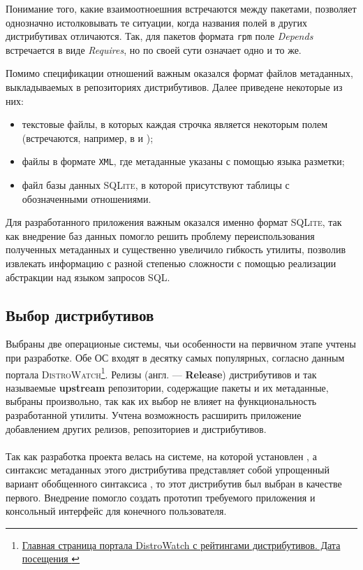 Понимание того, какие взаимоотноешния встречаются между пакетами, позволяет однозначно истолковывать те ситуации, когда названия полей в других дистрибутивах отличаются.
Так, для пакетов формата \texttt{rpm} поле \textit{Depends} встречается в виде \textit{Requires}, но по своей сути означает одно и то же.

Помимо спецификации отношений важным оказался формат файлов метаданных, выкладываемых в репозиториях дистрибутивов.
Далее приведене некоторые из них:
\begin{itemize}
	\item текстовые файлы, в которых каждая строчка является некоторым полем (встречаются, например, в {\debian} и {\ubuntu});
	\item файлы в формате \texttt{XML}, где метаданные указаны с помощью языка разметки;
	\item файл базы данных \textsc{SQLite}, в которой присутствуют таблицы с обозначенными отношениями.
\end{itemize}

Для разработанного приложения важным оказался именно формат \textsc{SQLite}, так как внедрение баз данных помогло решить проблему переиспользования полученных метаданных и существенно увеличило гибкость утилиты, позволив извлекать информацию с разной степенью сложности с помощью реализации абстракции над языком запросов \textsc{SQL}.

\subsection{Выбор дистрибутивов}
Выбраны две операционые системы, чьи особенности на первичном этапе учтены при разработке.
Обе ОС входят в десятку самых популярных, согласно данным портала \textsc{DistroWatch}\footnote{\href{https://distrowatch.com/}{Главная страница портала DistroWatch с рейтингами дистрибутивов. Дата посещения }}.
Релизы (англ. --- \textbf{Release}) дистрибутивов и так называемые \textbf{upstream} репозитории, содержащие пакеты и их метаданные, выбраны произвольно, так как их выбор не влияет на функциональность разработанной утилиты.
Учтена возможность расширить приложение добавлением других релизов, репозиториев и дистрибутивов.

\paragraph{\ubuntu}
Так как разработка проекта велась на системе, на которой установлен {\ubuntu}, а синтаксис метаданных этого дистрибутива представляет собой упрощенный вариант обобщенного синтаксиса {\debian}, то этот дистрибутив был выбран в качестве первого.
Внедрение {\ubuntu} помогло создать прототип требуемого приложения и консольный интерфейс для конечного пользователя.

